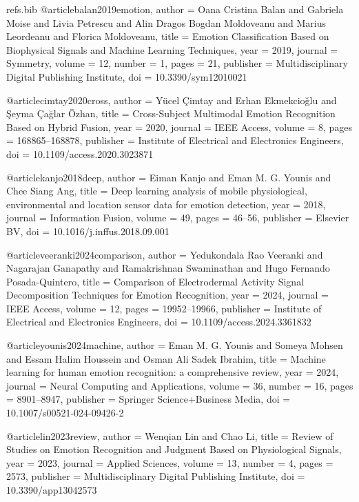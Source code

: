 \begin{filecontents*}[overwrite]{refs.bib}
@article{balan2019emotion,
  author = {Oana Cristina Balan and Gabriela Moise and Livia Petrescu and Alin Dragos Bogdan Moldoveanu and Marius Leordeanu and Florica Moldoveanu},
  title = {{Emotion Classification Based on Biophysical Signals and Machine Learning Techniques}},
  year = {2019},
  journal = {Symmetry},
  volume = {12},
  number = {1},
  pages = {21},
  publisher = {Multidisciplinary Digital Publishing Institute},
  doi = {10.3390/sym12010021}
}

@article{cimtay2020cross,
  author = {Y{\"u}cel {\c{C}}imtay and Erhan Ekmekcio{\v{g}}lu and {\c{S}}eyma {\c{C}}a{\u{g}}lar {\"O}zhan},
  title = {{Cross-Subject Multimodal Emotion Recognition Based on Hybrid Fusion}},
  year = {2020},
  journal = {IEEE Access},
  volume = {8},
  pages = {168865--168878},
  publisher = {Institute of Electrical and Electronics Engineers},
  doi = {10.1109/access.2020.3023871}
}

@article{kanjo2018deep,
  author = {Eiman Kanjo and Eman M. G. Younis and Chee Siang Ang},
  title = {{Deep learning analysis of mobile physiological, environmental and location sensor data for emotion detection}},
  year = {2018},
  journal = {Information Fusion},
  volume = {49},
  pages = {46--56},
  publisher = {Elsevier BV},
  doi = {10.1016/j.inffus.2018.09.001}
}

@article{veeranki2024comparison,
  author = {Yedukondala Rao Veeranki and Nagarajan Ganapathy and Ramakrishnan Swaminathan and Hugo Fernando Posada-Quintero},
  title = {{Comparison of Electrodermal Activity Signal Decomposition Techniques for Emotion Recognition}},
  year = {2024},
  journal = {IEEE Access},
  volume = {12},
  pages = {19952--19966},
  publisher = {Institute of Electrical and Electronics Engineers},
  doi = {10.1109/access.2024.3361832}
}

@article{younis2024machine,
  author = {Eman M. G. Younis and Someya Mohsen and Essam Halim Houssein and Osman Ali Sadek Ibrahim},
  title = {{Machine learning for human emotion recognition: a comprehensive review}},
  year = {2024},
  journal = {Neural Computing and Applications},
  volume = {36},
  number = {16},
  pages = {8901--8947},
  publisher = {Springer Science+Business Media},
  doi = {10.1007/s00521-024-09426-2}
}

@article{lin2023review,
  author = {Wenqian Lin and Chao Li},
  title = {{Review of Studies on Emotion Recognition and Judgment Based on Physiological Signals}},
  year = {2023},
  journal = {Applied Sciences},
  volume = {13},
  number = {4},
  pages = {2573},
  publisher = {Multidisciplinary Digital Publishing Institute},
  doi = {10.3390/app13042573}
}


\end{filecontents*}
